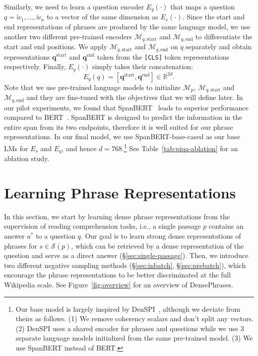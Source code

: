 \documentclass[11pt,a4paper]{article}
\newcommand{\ours}{DensePhrases}
\newcommand{\phraseinp}{\mathcal{S}(p)}
\newcommand{\lm}{\mathcal{M}}
\newcommand\mf[1]{\mathbf{#1}}
\begin{document}
Similarly, we need to learn a question encoder $E_q(\cdot)$ that maps a question $q = \tilde{w}_1, \ldots, \tilde{w}_{n}$ to a vector of the same dimension as $E_s(\cdot)$. Since the start and end representations of phrases are produced by the same language model, we use another two different pre-trained encoders $\lm_{q, \text{start}}$ and $\lm_{q, \text{end}}$ to differentiate the start and end positions. We apply $\lm_{q, \text{start}}$ and $\lm_{q, \text{end}}$ on $q$ separately and obtain representations $\mf{q}^\text{start}$ and $\mf{q}^\text{end}$ taken from the \texttt{[CLS]} token representations respectively. Finally, $E_q(\cdot)$ simply takes their concatenation:
\vspace{-0.5em}
\begin{equation}
E_q(q) = [\mf{q}^\text{start}, \mf{q}^\text{end}] \in \mathbb{R}^{2d}.
\end{equation}
Note that we use pre-trained language models to initialize $\lm_p$, $\lm_{q, \text{start}}$ and $\lm_{q, \text{end}}$ and they are fine-tuned with the objectives that we will define later. In our pilot experiments, we found that SpanBERT~\citep{joshi2020spanbert} leads to superior performance compared to BERT~\cite{devlin2019bert}.
SpanBERT is designed to predict the information in the entire span from its two endpoints, therefore it is well suited for our phrase representations.
In our final model, we use SpanBERT-base-cased as our base LMs for $E_s$ and $E_q$, and hence $d=768$.\footnote{Our base model is largely inspired by DenSPI~\cite{seo2019real}, although we deviate from theirs as follows. (1)
We remove coherency scalars and don't split any vectors.
(2) DenSPI uses a shared encoder for phrases and questions while we use 3 separate language models initialized from the same pre-trained model. (3) We use SpanBERT instead of BERT. } See Table~\ref{tab:piqa-ablation} for an ablation study.






\section{Learning Phrase Representations}
\label{sec:learning_phrases}

In this section, we start by learning dense phrase representations from the supervision of reading comprehension tasks, i.e., a single passage $p$ contains an answer $a^*$ to a question $q$.
Our goal is to learn strong dense representations of phrases for $s \in \phraseinp$, which can be retrieved by a dense representation of the question and serve as a direct answer (\S\ref{sec:single-passage}).
Then, we introduce two different negative sampling methods (\S\ref{sec:inbatch}, \S\ref{sec:prebatch}), which encourage the phrase representations to be better discriminated at the full Wikipedia scale.
See Figure~\ref{fig:overview} for an overview of \ours.
\end{document}
